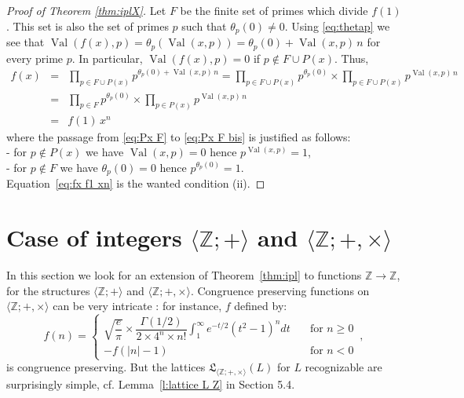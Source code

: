 \documentclass[11pt,a4paper]{article}
\theoremstyle{definition} %
\newcommand\+[1]{\mathcal{#1}} %
\newcommand{\Z}{{\mathbb Z}}     %
\newcommand{\Latt}{{\mathfrak{L}}}
\DeclareMathOperator{\val}{Val}%
\begin{document}
\begin{proof} [Proof of Theorem \ref{thm:iplX}]
Let $F$ be the finite set of primes which divide $f(1)$.
This set is also the set of primes $p$ such that $\theta_p(0)\neq0$.
Using \eqref{eq:thetap} we see that 
$\val(f(x),p)=\theta_p(\val(x,p)) =  \theta_p(0) + \val(x,p)\,n$ for every prime $p$.
In particular, $\val(f(x),p)=0$ if $p\notin F\cup P(x)$.
Thus,
\begin{eqnarray}%
\label{eq:Px F}
f(x) &=& \prod_{p\in F\cup P(x)}  p^{\theta_p(0) + \val(x,p)\,n} 
= \prod_{p\in F\cup P(x)} p^{\theta_p(0)}
            \times \prod_{p\in F\cup P(x)} p^{\val(x,p)\,n} 
\\\label{eq:Px F bis}
&=& \prod_{p\in F} p^{\theta_p(0)} \times \prod_{p\in P(x)} p^{\val(x,p)\,n} 
\\\label{eq:fx f1 xn}
&=& f(1)\,x^n
\end{eqnarray}
where the passage from \eqref{eq:Px F} to \eqref{eq:Px F bis} is justified as follows:
\\\indent- for $p\notin P(x)$ we have $\val(x,p)=0$ hence $p^{\val(x,p)}=1$,
\\\indent- for $p\notin F$ we have $\theta_p(0)=0$ hence $p^{\theta_p(0)}=1$.
\\
Equation~\eqref{eq:fx f1 xn} is the wanted condition (ii).
\end{proof}


\section{ Case of integers $\langle  \Z ;+\rangle$ and  $\langle  \Z ;+,\times\rangle$} 
\label{s Z}

 In this section we look for an  extension of Theorem~\ref{thm:ipl}  to functions $\Z\to\Z$, for the structures $\langle  \Z ;+\rangle$ and $\langle  \Z ;+,\times\rangle$.  
 Congruence preserving functions on $\langle  \Z ;+,\times\rangle$ can be very intricate \cite{cgg14B}: 
for instance,  $f$ defined by:
$$
f(n)= \left\{\begin{array}{ll}
\sqrt{\dfrac{e}{\pi}}
\times  \dfrac{\Gamma(1/2)}{2\times4^n\times n!}
\displaystyle\int_1^\infty e^{-t/2}(t^2-1)^n dt
&\quad\text{for $n\geq 0$}
\\
-f(|n|-1)&\quad\text{for $n<0$}
\end{array}\right.\,,
$$
is congruence preserving.
But the lattices $\Latt_{\langle\Z;+,\times\rangle}(L)$ for $L$ recognizable are surprisingly simple, cf.\! Lemma~\ref{l:lattice L Z} in Section 5.4.
 
\end{document}
